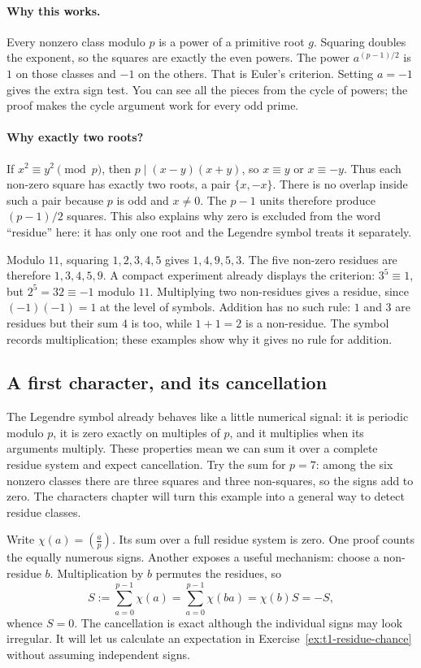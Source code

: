 \paragraph{Why this works.}
Every nonzero class modulo $p$ is a power of a primitive root $g$. Squaring doubles the exponent, so the squares are exactly the even powers. The power $a^{(p-1)/2}$ is $1$ on those classes and $-1$ on the others. That is Euler's criterion. Setting $a=-1$ gives the extra sign test. You can see all the pieces from the cycle of powers; the proof makes the cycle argument work for every odd prime.

\paragraph{Why exactly two roots?}
If $x^2\equiv y^2\pmod p$, then $p\mid(x-y)(x+y)$, so $x\equiv y$ or
$x\equiv-y$. Thus each non-zero square has exactly two roots, a pair
$\{x,-x\}$. There is no overlap inside such a pair because $p$ is odd and
$x\ne0$. The $p-1$ units therefore produce $(p-1)/2$ squares. This also
explains why zero is excluded from the word ``residue'' here: it has only one
root and the Legendre symbol treats it separately.

Modulo $11$, squaring $1,2,3,4,5$ gives $1,4,9,5,3$. The five non-zero
residues are therefore $1,3,4,5,9$. A compact experiment already displays the
criterion: $3^5\equiv1$, but $2^5=32\equiv-1$ modulo $11$.
Multiplying two non-residues gives a residue, since $(-1)(-1)=1$ at the level
of symbols. Addition has no such rule: $1$ and $3$ are residues but their sum
$4$ is too, while $1+1=2$ is a non-residue. The symbol records multiplication; these examples show why it gives no rule for addition.

\subsection*{A first character, and its cancellation}
The Legendre symbol already behaves like a little numerical signal: it is periodic modulo $p$, it is zero exactly on multiples of $p$, and it multiplies when its arguments multiply. These properties mean we can sum it over a complete residue system and expect cancellation. Try the sum for $p=7$: among the six nonzero classes there are three squares and three non-squares, so the signs add to zero. The characters chapter will turn this example into a general way to detect residue classes.

Write $\chi(a)=\left(\frac ap\right)$. Its sum over a full residue system is zero. One proof counts the equally
numerous signs. Another exposes a useful mechanism: choose a non-residue $b$.
Multiplication by $b$ permutes the residues, so
\[
S:=\sum_{a=0}^{p-1}\chi(a)
=\sum_{a=0}^{p-1}\chi(ba)=\chi(b)S=-S,
\]
whence $S=0$. The cancellation is exact although the individual signs may
look irregular. It will let us calculate an expectation in
Exercise~\ref{ex:t1-residue-chance} without assuming independent signs.

